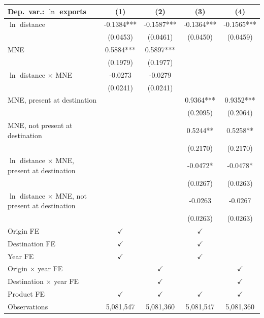\begin{tabular}{lcccc} \hline
Dep.\ var.: $\ln$ exports & (1) & (2) & (3) & (4) \\ \hline
$\ln$ distance & -0.1384*** & -0.1587*** & -0.1364*** & -0.1565*** \\
 & (0.0453) & (0.0461) & (0.0450) & (0.0459) \\
MNE & 0.5884*** & 0.5897*** &  &  \\
 & (0.1979) & (0.1977) &  &  \\
$\ln$ distance $\times$ MNE & -0.0273 & -0.0279 &  &  \\
 & (0.0241) & (0.0241) &  &  \\
MNE, present at destination &  &  & 0.9364*** & 0.9352*** \\
 &  &  & (0.2095) & (0.2064) \\
MNE, not present at destination &  &  & 0.5244** & 0.5258** \\
 &  &  & (0.2170) & (0.2170) \\
$\ln$ distance $\times$ MNE, present at destination &  &  & -0.0472* & -0.0478* \\
 &  &  & (0.0267) & (0.0263) \\
$\ln$ distance $\times$ MNE, not present at destination &  &  & -0.0263 & -0.0267 \\
 &  &  & (0.0263) & (0.0263) \\
\hline
Origin FE & $\checkmark$ &  & $\checkmark$ &  \\
Destination FE & $\checkmark$ &  & $\checkmark$ &  \\
Year FE & $\checkmark$ &  & $\checkmark$ &  \\
Origin $\times$ year FE &  & $\checkmark$ &  & $\checkmark$ \\
Destination $\times$ year FE &  & $\checkmark$ &  & $\checkmark$ \\
Product FE & $\checkmark$ & $\checkmark$ & $\checkmark$ & $\checkmark$ \\
\hline
Observations & 5,081,547 & 5,081,360 & 5,081,547 & 5,081,360 \\
\hline
\end{tabular}
